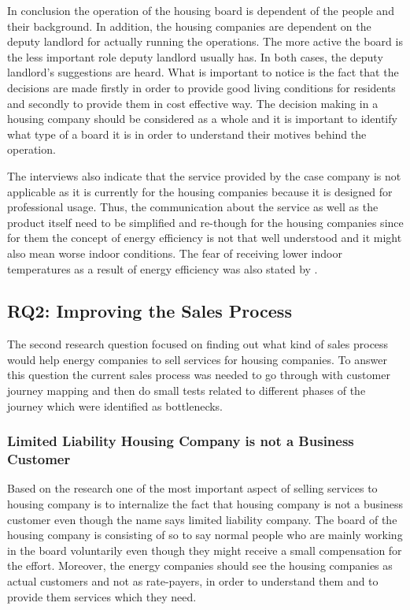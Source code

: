 In conclusion the operation of the housing board is dependent of the people and their background. In addition, the housing companies are dependent on the deputy landlord for actually running the operations. The more active the board is the less important role deputy landlord usually has. In both cases, the deputy landlord's suggestions are heard. What is important to notice is the fact that the decisions are made firstly in order to provide good living conditions for residents and secondly to provide them in cost effective way. The decision making in a housing company should be considered as a whole and it is important to identify what type of a board it is in order to understand their motives behind the operation.

The interviews also indicate that the service provided by the case company is not applicable as it is currently for the housing companies because it is designed for professional usage. Thus, the communication about the service as well as the product itself need to be simplified and re-though for the housing companies since for them the concept of energy efficiency is not that well understood and it might also mean worse indoor conditions. The fear of receiving lower indoor temperatures as a result of energy efficiency was also stated by \textcite{PehkonenThesis:2012}.

\subsection{RQ2: Improving the Sales Process}

The second research question focused on finding out what kind of sales process would help energy companies to sell services for housing companies. To answer this question the current sales process was needed to go through with customer journey mapping and then do small tests related to different phases of the journey which were identified as bottlenecks.

\subsubsection*{Limited Liability Housing Company is not a Business Customer}

Based on the research one of the most important aspect of selling services to housing company is to internalize the fact that housing company is not a business customer even though the name says limited liability company. The board of the housing company is consisting of so to say normal people who are mainly working in the board voluntarily even though they might receive a small compensation for the effort. Moreover, the energy companies should see the housing companies as actual customers and not as rate-payers, in order to understand them and to provide them services which they need.

